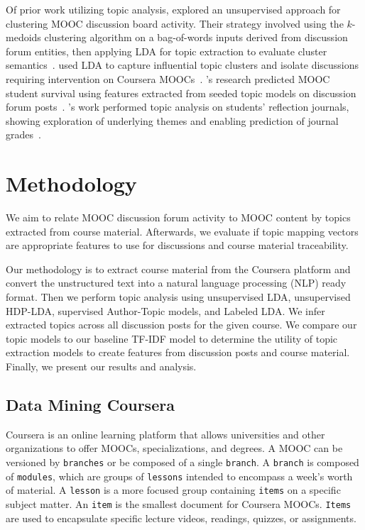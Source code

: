 \documentclass[sigconf, anonymous]{acmart}
\begin{document}
Of prior work utilizing topic analysis, \citeauthor{ezen2015unsupervised} explored an unsupervised approach for clustering MOOC discussion board activity. Their strategy involved using the $k$-medoids clustering algorithm on a bag-of-words inputs derived from discussion forum entities, then applying LDA for topic extraction to evaluate cluster semantics~\cite{ezen2015unsupervised}.
\citeauthor{atapattu2016topic} used LDA to capture influential topic clusters and isolate discussions requiring intervention on Coursera MOOCs~\cite{atapattu2016topic}.
\citeauthor{ramesh2014understanding}'s research predicted MOOC student survival using features extracted from seeded topic models on discussion forum posts~\cite{ramesh2014understanding}.
\citeauthor{Chen:2016:TME:2883851.2883951}'s work performed topic analysis on students' reflection journals, showing exploration of underlying themes and enabling prediction of journal grades~\cite{Chen:2016:TME:2883851.2883951}.


\section{Methodology}
We aim to relate MOOC discussion forum activity to MOOC content by topics extracted from course material.
Afterwards, we evaluate if topic mapping vectors are appropriate features to use for discussions and course material traceability.

Our methodology is to extract course material from the Coursera platform and convert the unstructured text into a natural language processing (NLP) ready format.
Then we perform topic analysis using unsupervised LDA, unsupervised HDP-LDA, supervised Author-Topic models, and Labeled LDA.
We infer extracted topics across all discussion posts for the given course.
We compare our topic models to our baseline TF-IDF model to determine the utility of topic extraction models to create features from discussion posts and course material.
Finally, we present our results and analysis.

\subsection{Data Mining Coursera}
Coursera is an online learning platform that allows universities and other organizations to offer MOOCs, specializations, and degrees.
A MOOC can be versioned by \texttt{branches} or be composed of a single \texttt{branch}.
A \texttt{branch} is composed of \texttt{modules}, which are groups of \texttt{lessons} intended to encompass a week's worth of material.
A \texttt{lesson} is a more focused group containing \texttt{items} on a specific subject matter.
An \texttt{item} is the smallest document for Coursera MOOCs. \texttt{Items} are used to encapsulate specific lecture videos, readings, quizzes, or assignments.
\end{document}
